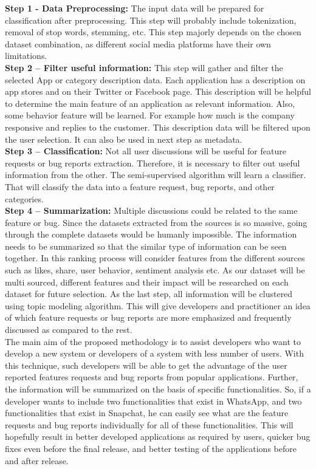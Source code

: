 \textbf{Step 1 - Data Preprocessing: } The input data will be prepared for classification after preprocessing. This step will probably include tokenization, removal of stop words, stemming, etc. This step majorly depends on the chosen dataset combination, as different social media platforms have their own limitations.\\

\textbf{Step 2 –  Filter useful information: } This step will gather and filter the selected App or category description data. Each application has a description on app stores and on their Twitter or Facebook page. This description will be helpful to determine the main feature of an application as relevant information. Also, some behavior feature will be learned.  For example how much is the company responsive and replies to the customer. This description data will be filtered upon the user selection. It can also be used in next step as metadata.\\

\textbf{Step 3 –  Classification: } Not all user discussions will be useful for feature requests or bug reports extraction. Therefore, it is necessary to filter out useful information from the other. The semi-supervised algorithm will learn a classifier. That will classify the data into a feature request, bug reports, and other categories.\\

\textbf{Step 4 – Summarization: } Multiple discussions could be related to the same feature or bug.
Since the datasets extracted from the sources is so massive, going through the complete datasets
would be humanly impossible. The information needs to be summarized so that the similar type
of information can be seen together. In this ranking process will consider features from the different sources such as likes, share, user behavior, sentiment analysis etc. As our dataset will be multi sourced, different features and their impact will be researched on each dataset for future selection. As the last step, all information will be clustered using topic modeling algorithm. This will
give developers and practitioner an idea of which feature requests or bug reports are more emphasized and frequently discussed as compared to the rest.\\

	The main aim of the proposed methodology is to assist developers who want to develop a new
system or developers of a system with less number of users. With this technique, such
developers will be able to get the advantage of the user reported features requests and bug reports
from popular applications. Further, the information will be summarized on the basis of specific
functionalities. So, if a developer wants to include two functionalities that exist in WhatsApp,
and two functionalities that exist in Snapchat, he can easily see what are the feature requests
and bug reports individually for all of these functionalities. This will hopefully result in better
developed applications as required by users, quicker bug fixes even before the final release, and
better testing of the applications before and after release.

